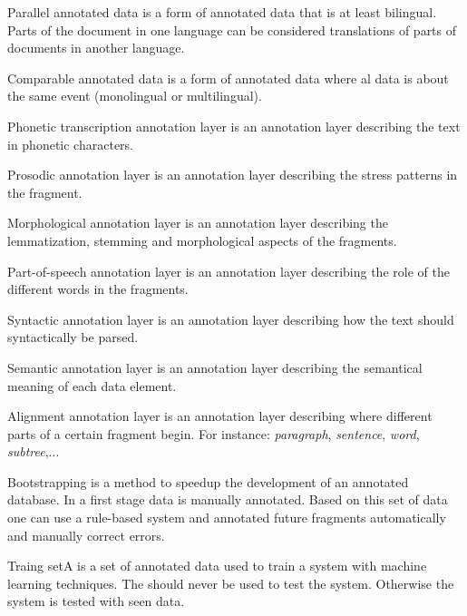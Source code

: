 \begin{df}{Parallel annotated data}\sb{} is a form of annotated data that is at least bilingual. Parts of the document in one language can be considered translations of parts of documents in another language.
\end{df}
\begin{df}{Comparable annotated data}\sb{} is a form of annotated data where al data is about the same event (monolingual or multilingual).
\end{df}
\begin{df}{Phonetic transcription annotation layer}\sb{} is an annotation layer describing the text in phonetic characters.
\end{df}
\begin{df}{Prosodic annotation layer}\sb{} is an annotation layer describing the stress patterns in the fragment.
\end{df}
\begin{df}{Morphological annotation layer}\sb{} is an annotation layer describing the lemmatization, stemming and morphological aspects of the fragments.
\end{df}
\begin{df}{Part-of-speech annotation layer}\sb{} is an annotation layer describing the role of the different words in the fragments.
\end{df}
\begin{df}{Syntactic annotation layer}\sb{} is an annotation layer describing how the text should syntactically be parsed.
\end{df}
\begin{df}{Semantic annotation layer}\sb{} is an annotation layer describing the semantical meaning of each data element.
\end{df}
\begin{df}{Alignment annotation layer}\sb{} is an annotation layer describing where different parts of a certain fragment begin. For instance: \emph{paragraph}, \emph{sentence}, \emph{word}, \emph{subtree},...
\end{df}
\begin{df}{Bootstrapping}\sb{} is a method to speedup the development of an annotated database. In a first stage data is manually annotated. Based on this set of data one can use a rule-based system and annotated future fragments automatically and manually correct errors.
\end{df}
\begin{df}{Traing set}A \sb{} is a set of annotated data used to train a system with machine learning techniques. The \sb{} should never be used to test the system. Otherwise the system is tested with seen data.
\end{df}
